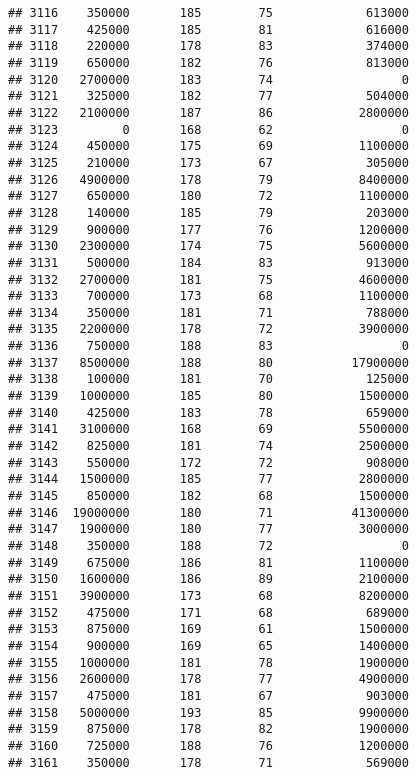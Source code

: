 \documentclass[
]{article}
\begin{document}
\begin{verbatim}
## 3116    350000       185        75             613000
## 3117    425000       185        81             616000
## 3118    220000       178        83             374000
## 3119    650000       182        76             813000
## 3120   2700000       183        74                  0
## 3121    325000       182        77             504000
## 3122   2100000       187        86            2800000
## 3123         0       168        62                  0
## 3124    450000       175        69            1100000
## 3125    210000       173        67             305000
## 3126   4900000       178        79            8400000
## 3127    650000       180        72            1100000
## 3128    140000       185        79             203000
## 3129    900000       177        76            1200000
## 3130   2300000       174        75            5600000
## 3131    500000       184        83             913000
## 3132   2700000       181        75            4600000
## 3133    700000       173        68            1100000
## 3134    350000       181        71             788000
## 3135   2200000       178        72            3900000
## 3136    750000       188        83                  0
## 3137   8500000       188        80           17900000
## 3138    100000       181        70             125000
## 3139   1000000       185        80            1500000
## 3140    425000       183        78             659000
## 3141   3100000       168        69            5500000
## 3142    825000       181        74            2500000
## 3143    550000       172        72             908000
## 3144   1500000       185        77            2800000
## 3145    850000       182        68            1500000
## 3146  19000000       180        71           41300000
## 3147   1900000       180        77            3000000
## 3148    350000       188        72                  0
## 3149    675000       186        81            1100000
## 3150   1600000       186        89            2100000
## 3151   3900000       173        68            8200000
## 3152    475000       171        68             689000
## 3153    875000       169        61            1500000
## 3154    900000       169        65            1400000
## 3155   1000000       181        78            1900000
## 3156   2600000       178        77            4900000
## 3157    475000       181        67             903000
## 3158   5000000       193        85            9900000
## 3159    875000       178        82            1900000
## 3160    725000       188        76            1200000
## 3161    350000       178        71             569000

\end{verbatim}
\end{document}
